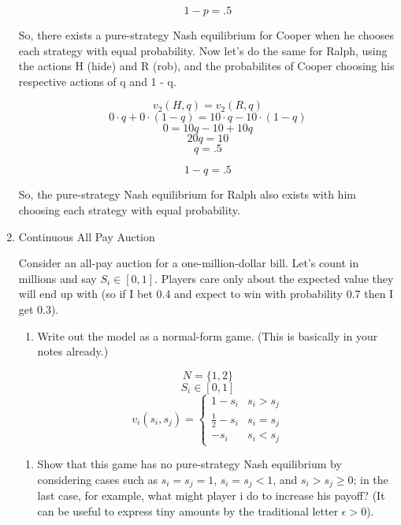 \documentclass{article}
\begin{document}
\begin{enumerate}
          \[1 - p = .5\]

          So, there exists a pure-strategy Nash equilibrium for Cooper when he chooses each strategy with equal probability. Now let's do the same for Ralph, using the actions H (hide) and R (rob), and the probabilites of Cooper choosing his respective actions of q and 1 - q.

          \[v_2(H, q) = v_2(R, q)\]
          \[0 \cdot q + 0 \cdot (1 - q) = 10 \cdot q - 10 \cdot (1 - q)\]
          \[0 = 10q - 10 + 10q\]
          \[20q = 10\]
          \[q = .5\]

          \[1 - q = .5\]

          So, the pure-strategy Nash equilibrium for Ralph also exists with him choosing each strategy with equal probability.

    \item Continuous All Pay Auction

          Consider an all-pay auction for a one-million-dollar bill. Let's count in millions and say $S_i \in [0, 1]$. Players care only about the expected value they will end up with (so if I bet 0.4 and expect to win with probability 0.7 then I get 0.3).

          \begin{enumerate}[label=(\alph*)]
              \item Write out the model as a normal-form game. (This is basically in your notes already.)
          \end{enumerate}

          \[N = \{1, 2\}\]
          \[S_i \in [0, 1]\]
          \[v_i(s_i, s_j) = \begin{cases}
                  1 - s_i           & s_i > s_j \\
                  \frac{1}{2} - s_i & s_i = s_j \\
                  -s_i              & s_i < s_j
              \end{cases}
          \]

          \begin{enumerate}[resume]
              \item Show that this game has no pure-strategy Nash equilibrium by considering cases such as $s_i = s_j = 1$, $s_i = s_j < 1$, and $s_i > s_j \geq 0$; in the last case, for example, what might player i do to increase his payoff? (It can be useful to express tiny amounts by the traditional letter $\epsilon > 0$).
          \end{enumerate}


\end{enumerate}
\end{document}
